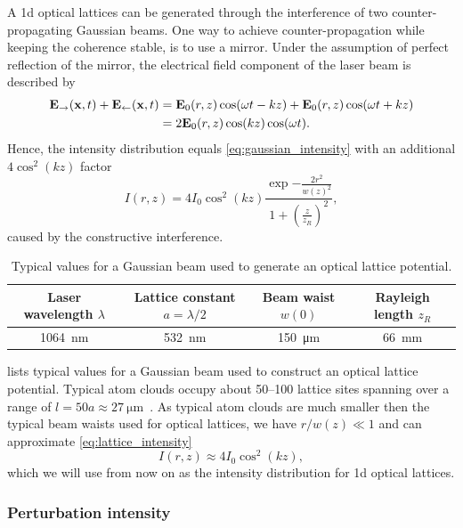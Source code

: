 A \gls{1d} optical lattices can be generated through the interference
of two counter-propagating Gaussian beams. One way to achieve
counter-propagation while keeping the coherence stable, is to use a mirror.
Under the assumption of perfect reflection of the mirror, the electrical field
component of the laser beam is described by
\begin{align*}
  \vb{E}_\rightarrow(\vb{x},t)+\vb{E}_\leftarrow(\vb{x},t)
  &=
  \vb{E}_0(r,z)\cos(\omega t-kz)+\vb{E}_0(r,z)\cos(\omega t+kz)\\
  &=
  2\vb{E}_0(r,z)\cos(kz)\cos(\omega t).
\end{align*}
Hence, the intensity distribution equals
\cref{eq:gaussian_intensity} with an additional $4\cos^2(kz)$ factor
\begin{equation}
  I(r,z)
  =
  4I_0\cos^2(kz)
  \frac{\exp{-\frac{2r^2}{w{(z)}^2}}}{1+{\left(\frac{z}{z_R}\right)}^2}
  \label{eq:lattice_intensity},
\end{equation}
caused by the constructive interference.
\begin{table}[htb]
  \centering
  \begin{tabular}{cccc}
    \toprule
    Laser wavelength $\lambda$ &
    Lattice constant $a=\lambda/2$ &
    Beam waist $w(0)$ &
    Rayleigh length $z_R$ \\
    \midrule
    \SI{1064}{\nano\meter} &
    \SI{532}{\nano\meter} &
    \SI{150}{\micro\meter} &
    \SI{66}{\milli\meter} \\
    \bottomrule
  \end{tabular}
  \captionsetup{width=.8\textwidth}
  \caption{Typical values for a Gaussian beam used to generate an optical
    lattice potential.
  }\label{tab:gaussian_beam_lattice}
\end{table}
 lists typical values for a Gaussian beam
used to construct an optical lattice potential. Typical atom clouds occupy
about 50--100 lattice sites spanning over a range of
$l=50a\approx\SI{27}{\micro\meter}$~\cite{Rom2009}. As typical atom clouds
are much smaller then the typical beam waists used for optical lattices, we
have $r/w(z)\ll1$ and can approximate \cref{eq:lattice_intensity}
\begin{equation}
  I(r,z)
  \approx
  4I_0\cos^2(kz)
  \label{eq:gaussian_intensity_approx},
\end{equation}
which we will use from now on as the intensity distribution for \gls{1d}
optical lattices.

\subsubsection{Perturbation intensity}

